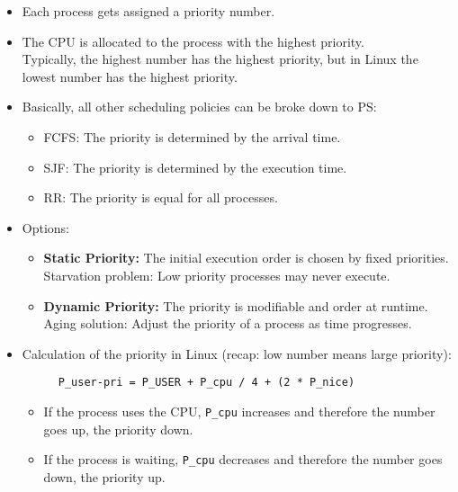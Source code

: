 			\begin{itemize}
				\item Each process gets assigned a priority number.
				\item The CPU is allocated to the process with the highest priority. \\ Typically, the highest number has the highest priority, but in Linux the lowest number has the highest priority.
				\item Basically, all other scheduling policies can be broke down to PS:
					\begin{itemize}
						\item FCFS: The priority is determined by the arrival time.
						\item SJF: The priority is determined by the execution time.
						\item RR: The priority is equal for all processes.
					\end{itemize}
				\item Options:
					\begin{itemize}
						\item \textbf{Static Priority:} The initial execution order is chosen by fixed priorities. Starvation problem: Low priority processes may never execute.
						\item \textbf{Dynamic Priority:} The priority is modifiable and order at runtime. Aging solution: Adjust the priority of a process as time progresses.
					\end{itemize}
				\item Calculation of the priority in Linux (recap: low number means large priority):
					\begin{figure}[H]
						\centering
						\lstinline|P_user-pri = P_USER + P_cpu / 4 + (2 * P_nice)|
					\end{figure}
					\begin{itemize}
						\item If the process uses the CPU, \lstinline|P_cpu| increases and therefore the number goes up, the priority down.
						\item If the process is waiting, \lstinline|P_cpu| decreases and therefore the number goes down, the priority up.
					\end{itemize}
			\end{itemize}


